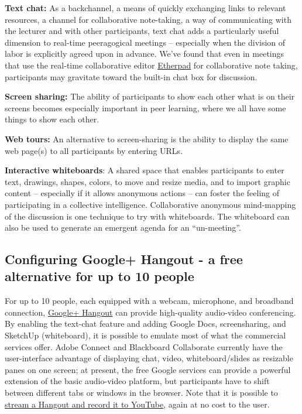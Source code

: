 \textbf{Text chat:} As a backchannel, a means of quickly exchanging
links to relevant resources, a channel for collaborative note-taking, a
way of communicating with the lecturer and with other participants, text
chat adds a particularly useful dimension to real-time peeragogical
meetings -- especially when the division of labor is explicitly agreed
upon in advance. We've found that even in meetings that use the
real-time collaborative editor \href{http://etherpad.org}{Etherpad} for
collaborative note taking, participants may gravitate toward the
built-in chat box for discussion.

\textbf{Screen sharing:} The ability of participants to show each other
what is on their screens becomes especially important in peer learning,
where we all have some things to show each other.

\textbf{Web tours:} An alternative to screen-sharing is the ability to
display the same web page(s) to all participants by entering URLs.

\textbf{Interactive whiteboards}: A shared space that enables
participants to enter text, drawings, shapes, colors, to move and resize
media, and to import graphic content -- especially if it allows
anonymous actions -- can foster the feeling of participating in a
collective intelligence. Collaborative anonymous mind-mapping of the
discussion is one technique to try with whiteboards. The whiteboard can
also be used to generate an emergent agenda for an ``un-meeting''.

\subsection{Configuring Google+ Hangout - a free alternative for up to
10 people}

For up to 10 people, each equipped with a webcam, microphone, and
broadband connection,
\href{http://lifehacker.com/5842191/google\%252B-hangouts-adds-screen-sharing-google-docs-collaboration-and-more}{Google+
Hangout} can provide high-quality audio-video conferencing. By enabling
the text-chat feature and adding Google Docs, screensharing, and
SketchUp (whiteboard), it is possible to emulate most of what the
commercial services offer. Adobe Connect and Blackboard Collaborate
currently have the user-interface advantage of displaying chat, video,
whiteboard/slides as resizable panes on one screen; at present, the free
Google services can provide a powerful extension of the basic
audio-video platform, but participants have to shift between different
tabs or windows in the browser. Note that it is possible to
\href{http://www.google.com/+/learnmore/hangouts/onair.html}{stream a
Hangout and record it to YouTube}, again at no cost to the user.

